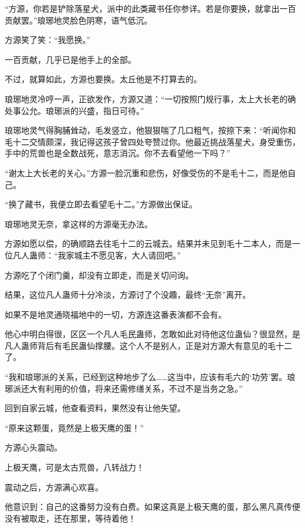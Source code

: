 \begin{this_body}
“方源，你若是铲除落星犬，派中的此类藏书任你参详。若是你要换，就拿出一百贡献罢。”琅琊地灵脸色阴寒，语气低沉。

方源笑了笑：“我愿换。”

一百贡献，几乎已是他手上的全部。

不过，就算如此，方源也要换。太丘他是不打算去的。

琅琊地灵冷哼一声，正欲发作，方源又道：“一切按照门规行事，太上大长老的确处事公允。琅琊派的兴盛，指日可待。”

琅琊地灵气得胸脯耸动，毛发竖立，他狠狠喘了几口粗气，按捺下来：“听闻你和毛十二交情颇深，我记得这孩子曾四处夸赞过你。他最近挑战落星犬，身受重伤，手中的荒兽也是全数战死，意志消沉。你不去看望他一下吗？”

“谢太上大长老的关心。”方源一脸沉重和悲伤，好像受伤的不是毛十二，而是他自己。

“换了藏书，我便立即去看望毛十二。”方源做出保证。

琅琊地灵无奈，拿这样的方源毫无办法。

方源如愿以偿，的确顺路去往毛十二的云城去。结果并未见到毛十二本人，而是一位凡人蛊师：“我家城主不愿见客，大人请回吧。”

方源吃了个闭门羹，却没有立即走，而是关切问询。

结果，这位凡人蛊师十分冷淡，方源讨了个没趣，最终“无奈”离开。

如果不是地灵通晓福地中的一切，方源连这番表演都不会有。

他心中明白得很，区区一个凡人毛民蛊师，怎敢如此对待他这位蛊仙？很显然，是凡人蛊师背后有毛民蛊仙撑腰。这个人不是别人，正是对方源大有意见的毛十二了。

“我和琅琊派的关系，已经到这种地步了么……这当中，应该有毛六的‘功劳’罢。琅琊派还大有利用的价值，将来还需修缮关系，不过不是当务之急。”

回到自家云城，他查看资料，果然没有让他失望。

“原来这颗蛋，竟然是上极天鹰的蛋！”

方源心头震动。

上极天鹰，可是太古荒兽，八转战力！

震动之后，方源满心欢喜。

他意识到：自己的这番努力没有白费。如果这真是上极天鹰的蛋，那么黑凡真传便没有被取走，还在那里，等待着他！

\end{this_body}

